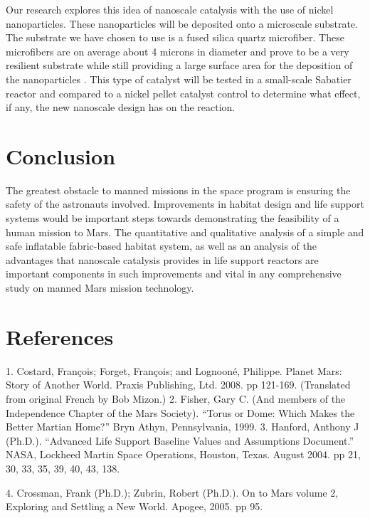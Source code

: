 \documentclass[12pt,letterpaper,oneside,twocolumn]{article}
\begin{document}
Our research explores this idea of nanoscale catalysis with the use of nickel nanoparticles. These nanoparticles will be deposited onto a microscale substrate. The substrate we have chosen to use is a fused silica quartz microfiber. These microfibers are on average about 4 microns in diameter and prove to be a very resilient substrate while still providing a large surface area for the deposition of the nanoparticles . This type of catalyst will be tested in a small-scale Sabatier reactor and compared to a nickel pellet catalyst control to determine what effect, if any, the new nanoscale design has on the reaction.


\section{Conclusion}
The greatest obstacle to manned missions in the space program is ensuring the safety of the astronauts involved. Improvements in habitat design and life support systems would be important steps towards demonstrating the feasibility of a human mission to Mars. The quantitative and qualitative analysis of a simple and safe inflatable fabric-based habitat system, as well as an analysis of the advantages that nanoscale catalysis provides in life support reactors are important components in such improvements and vital in any comprehensive study on manned Mars mission technology. 

\section{References}

1. Costard, François; Forget, François; and Lognooné, Philippe. Planet Mars: Story of Another World. Praxis Publishing, Ltd. 2008. pp 121-169. (Translated from original French by Bob Mizon.)
2. Fisher, Gary C. (And members of the Independence Chapter of the Mars Society). “Torus or Dome: Which Makes the Better Martian Home?” Bryn Athyn, Pennsylvania, 1999.
3. Hanford, Anthony J (Ph.D.). “Advanced Life Support Baseline Values and Assumptions Document.” NASA, Lockheed Martin Space Operations, Houston, Texas. August 2004. pp 21, 30, 33, 35, 39, 40, 43, 138.

4. Crossman, Frank (Ph.D.); Zubrin, Robert (Ph.D.).  On to Mars volume 2, Exploring and Settling a New World. Apogee, 2005.  pp 95. 
\end{document}
